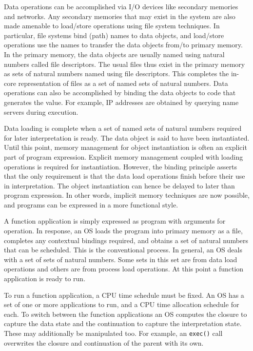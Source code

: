 \documentclass[draft]{article}
\begin{document}
Data  operations can be  accomplished via  I/O devices  like secondary
memories and networks.   Any secondary memories that may  exist in the
system  are also  made amenable  to load/store  operations  using file
system techniques.   In particular, file systems bind  (path) names to
data objects, and load/store operations  use the names to transfer the
data objects from/to primary memory.   In the primary memory, the data
objects  are   usually  named   using  natural  numbers   called  file
descriptors.  The usual files thus exist in the primary memory as sets
of natural  numbers named using file descriptors.   This completes the
in-core  representation of files  as a  set of  named sets  of natural
numbers.  Data operations can also be accomplished by binding the data
objects to code  that generates the value.  For  example, IP addresses
are obtained by querying name servers during execution.

Data loading is  complete when a set of named  sets of natural numbers
required for later  interpretation is ready.  The data  object is said
to have  been instantiated.  Until  this point, memory  management for
object instantiation is often  an explicit part of program expression.
Explicit memory management coupled with loading operations is required
for instantiation.   However, the  binding principle asserts  that the
only requirement is that the  data load operations finish before their
use in interpretation.  The  object instantiation can hence be delayed
to  later than program  expression.  In  other words,  implicit memory
techniques are now  possible, and programs can be  expressed in a more
functional style.

A function  application is simply expressed as  program with arguments
for  operation.  In  response, an  OS loads  the program  into primary
memory  as a  file, completes  any contextual  bindings  required, and
obtains a set  of natural numbers that can be  scheduled.  This is the
conventional process.  In  general, an OS deals with a  set of sets of
natural numbers.  Some sets in  this set are from data load operations
and others are from process load operations.  At this point a function
application is ready to run.

To run a function application, a  CPU time schedule must be fixed.  An
OS  has a  set of  one or  more applications  to run,  and a  CPU time
allocation  schedule  for  each.    To  switch  between  the  function
applications an OS computes the  closure to capture the data state and
the  continuation  to capture  the  interpretation  state.  These  may
additionally be manipulated too.  For example, an \texttt{exec()} call
overwrites the closure and continuation of the parent with its own.
\end{document}
